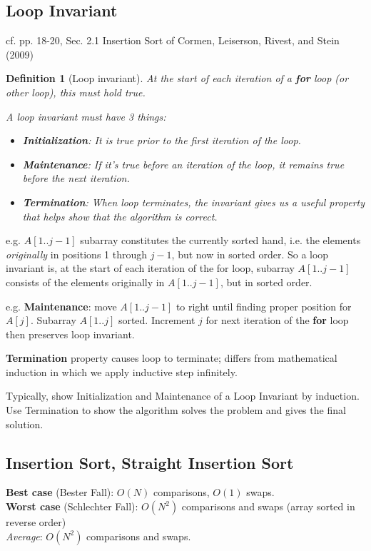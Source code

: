 \documentclass[10pt]{amsart}
\newtheorem{definition}{Definition}
\begin{document}
\subsection{Loop Invariant}

cf. pp. 18-20, Sec. 2.1 Insertion Sort of Cormen, Leiserson, Rivest, and Stein (2009) \cite{CLRS2009}

\begin{definition}[Loop invariant]
	At the start of each iteration of a \textbf{for} loop (or other loop), this must hold true.
	
	A loop invariant must have 3 things:
	\begin{itemize}
		\item \textbf{Initialization}: It is true prior to the first iteration of the loop.
		\item \textbf{Maintenance}: If it's true before an iteration of the loop, it remains true before the next iteration.
		\item \textbf{Termination}: When loop terminates, the invariant gives us a useful property that helps show that the algorithm is correct.
	\end{itemize}
\end{definition}

e.g. $A[1.. j-1]$ subarray constitutes the currently sorted hand, i.e. the elements \emph{originally} in positions 1 through $j-1$, but now in sorted order. So a loop invariant is, at the start of each iteration of the for loop, subarray $A[1.. j-1]$ consists of the elements originally in $A[1..j-1]$, but in sorted order.

e.g. \textbf{Maintenance}: move $A[1..j-1]$ to right until finding proper position for $A[j]$. Subarray $A[1..j]$ sorted. Increment $j$ for next iteration of the \textbf{for} loop then preserves loop invariant.

\textbf{Termination} property causes loop to terminate; differs from mathematical induction in which we apply inductive step infinitely.

Typically, show Initialization and Maintenance of a Loop Invariant by induction. Use Termination to show the algorithm solves the problem and gives the final solution.

\subsection{Insertion Sort, Straight Insertion Sort}

\textbf{Best case} (Bester Fall): $O(N)$ comparisons, $O(1)$ swaps. \\
\textbf{Worst case} (Schlechter Fall): $O(N^2)$ comparisons and swaps (array sorted in reverse order) \\
\emph{Average}: $O(N^2)$ comparisons and swaps. \\
\end{document}
